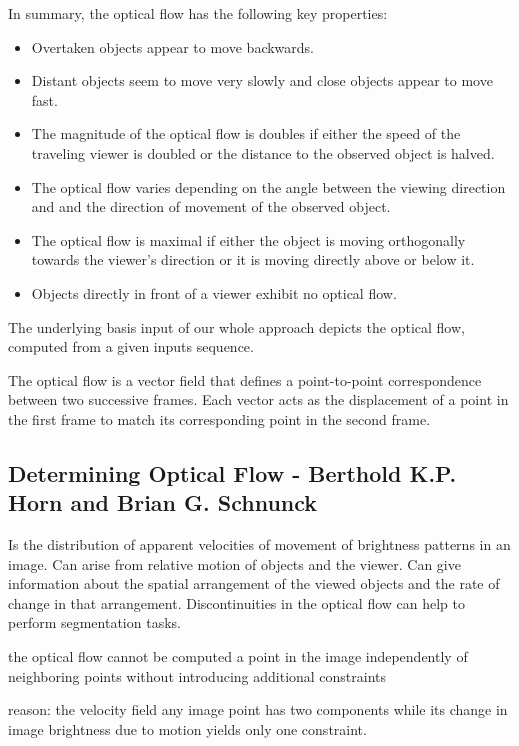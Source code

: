 In summary, the optical flow has the following key properties:
\begin{itemize}
  \item Overtaken objects appear to move backwards.
  \item Distant objects seem to move very slowly and close objects appear to move fast.
  \item The magnitude of the optical flow is doubles if either the speed of the traveling viewer is doubled or the distance to the observed object is halved.
  \item The optical flow varies depending on the angle between the viewing direction and and the direction of movement of the observed object.
  \item The optical flow is maximal if either the object is moving orthogonally towards the viewer's direction or it is moving directly above or below it.
  \item Objects directly in front of a viewer exhibit no optical flow.
\end{itemize}

The underlying basis input of our whole approach depicts the optical flow, computed from a given inputs sequence.

The optical flow is a vector field that defines a point-to-point correspondence between two successive frames. Each vector acts as the displacement of a point in the first frame to match its corresponding point in the second frame.



\subsection{Determining Optical Flow - Berthold K.P. Horn and Brian G. Schnunck}
\label{sec:hs_formulation}

Is the distribution of apparent velocities of movement of brightness patterns in an image.
Can arise from relative motion of objects and the viewer.
Can give information about the spatial arrangement of the viewed objects and the rate of change in that arrangement.
Discontinuities in the optical flow can help to perform segmentation tasks.

the optical flow cannot be computed a point in the image independently of neighboring points without introducing additional constraints

reason: the velocity field any image point has two components while its change in image brightness due to motion yields only one constraint.

